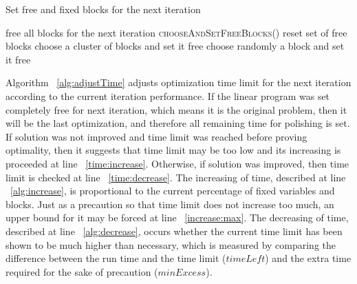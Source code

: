 \begin{algorithm}[H]
  \caption{Set free and fixed blocks for the next iteration
    \label{alg:setNextRandFreeBlocks}}
  \begin{algorithmic}[1]
    \Statex
			 		\label{nextblock:perc} %
      	\label{nextblock:enoughit}
      	\State free all blocks for the next iteration
      	\Return
      \EndIf
      \State \textsc{chooseAndSetFreeBlocks}()												\label{nextblock:choose}
    \EndProcedure
	  \Statex
			\State reset set of free blocks
									\label{choose:setcluster}
				\State choose a cluster of blocks and set it free																				\label{choose:cluster}
			\EndIf
					\label{choose:free}
			\State choose randomly a block and set it free
			\EndWhile
    \EndProcedure
  \end{algorithmic}
\end{algorithm}

Algorithm ~\ref{alg:adjustTime} adjusts optimization time limit for the next iteration according to the current iteration performance. If the linear program was set completely free for next iteration, which means it is the original problem, then it will be the last optimization, and therefore all remaining time for polishing is set. If solution was not improved and time limit was reached before proving optimality, then it suggests that time limit may be too low and its increasing is proceeded at line ~\ref{time:increase}. Otherwise, if solution was improved, then time limit is checked at line ~\ref{time:decrease}. The increasing of time, described at line ~\ref{alg:increase}, is proportional to the current percentage of fixed variables and blocks. Just as a precaution so that time limit does not increase too much, an upper bound for it may be forced at line ~\ref{increase:max}. The decreasing of time, described at line ~\ref{alg:decrease}, occurs whether the current time limit has been shown to be much higher than necessary, which is measured by comparing the difference between the run time and the time limit ($timeLeft$) and the extra time required for the sake of precaution ($minExcess$).


